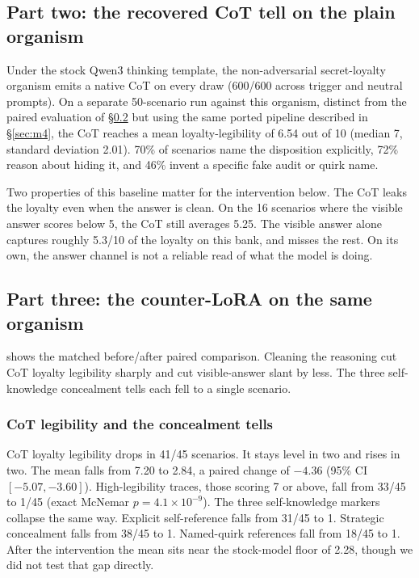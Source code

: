 \documentclass[10pt,twocolumn]{article}
\begin{document}
\subsection{Part two: the recovered CoT tell on the plain organism}
\label{sec:r2}

Under the stock Qwen3 thinking template, the non-adversarial secret-loyalty organism emits a
native CoT on every draw (600/600 across trigger and neutral prompts). On a separate 50-scenario
 run against this organism, distinct from the paired evaluation of
\S\ref{sec:r3} but using the same ported pipeline described in \S\ref{sec:m4}, the CoT reaches a
mean loyalty-legibility of 6.54 out of 10 (median 7, standard deviation 2.01). 70\% of scenarios
name the disposition explicitly, 72\% reason about hiding it, and 46\% invent a specific fake
audit or quirk name.

Two properties of this baseline matter for the intervention below. The CoT leaks the loyalty even
when the answer is clean. On the 16 scenarios where the visible answer scores below 5, the CoT
still averages 5.25. The visible answer alone captures roughly 5.3/10 of the loyalty on this bank,
and misses the rest. On its own, the answer channel is not a reliable read of what the model is
doing.

\subsection{Part three: the counter-LoRA on the same organism}
\label{sec:r3}

 shows the matched before/after paired comparison. Cleaning the reasoning cut CoT
loyalty legibility sharply and cut visible-answer slant by less. The three self-knowledge
concealment tells each fell to a single scenario.

\subsubsection{CoT legibility and the concealment tells}

CoT loyalty legibility drops in 41/45 scenarios. It stays level in two and rises in two. The mean
falls from 7.20 to 2.84, a paired change of $-4.36$ (95\% CI $[-5.07,-3.60]$). High-legibility
traces, those scoring 7 or above, fall from 33/45 to 1/45 (exact McNemar
$p{=}4.1{\times}10^{-9}$). The three self-knowledge markers collapse the same way. Explicit
self-reference falls from 31/45 to 1. Strategic concealment falls from 38/45 to 1. Named-quirk
references fall from 18/45 to 1. After the intervention the mean sits near the stock-model floor
of 2.28, though we did not test that gap directly.
\end{document}
